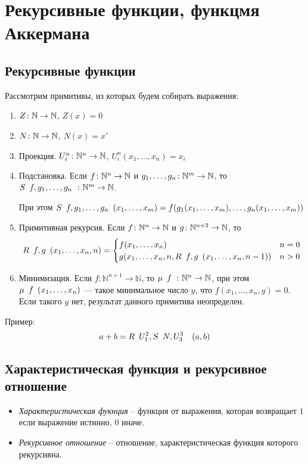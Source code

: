 \section{Рекурсивные функции, функцмя Аккермана}
\label{sec-10}
\subsection{Рекурсивные функции}
\label{sec-10-1}
Рассмотрим примитивы, из которых будем собирать выражения:

\begin{enumerate}
\item $Z \colon \mathbb{N} \rightarrow \mathbb{N}$, $Z(x) = 0$
\item $N \colon \mathbb{N} \rightarrow \mathbb{N}$, $N(x) = x'$
\item Проекция. $U^n_i \colon \mathbb{N}^n \rightarrow \mathbb{N}$, $U^n_i (x_1, \dotsc, x_n) = x_i$
\item Подстановка. Если $f \colon \mathbb{N}^n \rightarrow \mathbb{N}$ и $g_1, \dotsc, g_n \colon \mathbb{N}^m \rightarrow \mathbb{N}$,
    то $S\template{f,g_1,\dotsc, g_n} \colon \N^m \rightarrow \N$.

    При этом $S\template{f,g_1,\dotsc, g_n} (x_1,\dotsc, x_m) = f(g_1(x_1,\dotsc, x_m), \dotsc, g_n(x_1,\dotsc, x_m))$
\item Примитивная рекурсия. Если $f \colon \mathbb{N}^n     \to \mathbb{N}$ и 
                                 $g \colon \mathbb{N}^{n+2} \to \mathbb{N}$, то
    \[R\template{f, g}(x_1, \dotsc, x_n, n) = \begin{cases}
    	f(x_1, \dotsc, x_n) & n = 0 \\
    	g(x_1, \dotsc, x_n, n, R\ltemplate f, g\rtemplate(x_1, \dotsc, x_n, n - 1)) & n > 0
    \end{cases}\]
\item Минимизация. Если $f \colon \mathbb{N}^{n+1} \rightarrow \mathbb{N}$,
    то $\mu \template{f}\colon \mathbb{N}^n \rightarrow \mathbb{N}$, при этом
  $\mu \template{f} (x_1,\dotsc,x_n)$ --- такое минимальное число $y$, что $f(x_1,\dotsc, x_n, y) = 0$.
  Если такого $y$ нет, результат данного примитива неопределен.
\end{enumerate}

Пример:
\[a + b = R\template{U^2_1, S\template{N, U^3_3}}(a, b)\]
\subsection{Характеристическая функция и рекурсивное отношение}
\label{sec-10-2}
\begin{itemize}
\item \emph{Характеристическая фукнция} -- функция от выражения, которая возвращает $1$ если выражение истинно, $0$ иначе.
\item \emph{Рекурсивное отношение} -- отношение, характеристическая функция
которого рекурсивна.
\end{itemize}
